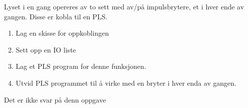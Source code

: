 

Lyset i en gang opereres av to sett med av/på impulsbrytere, et i hver ende
av gangen. Disse er kobla til en PLS.
\begin{enumerate}
\item Lag en skisse for oppkoblingen
\item Sett opp en IO liste
\item Lag et PLS program for denne funksjonen.
\item Utvid PLS programmet til å virke med en bryter i hver enda av gangen. 
\end{enumerate}
\vskip 10pt





Det er ikke svar på denn oppgave












